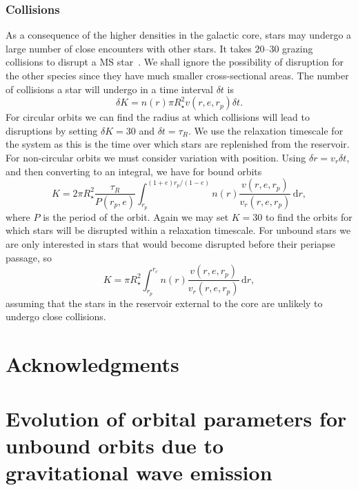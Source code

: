 \documentclass[useAMS,usedcolumn,usegraphicx,usenatbib]{mn2e}
\newcommand{\dd}{\ensuremath{\mathrm{d}}}
\newcommand{\intd}[4]{\ensuremath{\int_{#1}^{#2}{#3}\,\dd{#4}}}
\begin{document}
\subsubsection{Collisions}

As a consequence of the higher densities in the galactic core, stars may undergo a large number of close encounters with other stars. It takes $20$--$30$ grazing collisions to disrupt a MS star~\citep{Freitag2006}. We shall ignore the possibility of disruption for the other species since they have much smaller cross-sectional areas. The number of collisions a star will undergo in a time interval $\delta t$ is
\begin{equation}
\delta K = n(r) \pi R_\star^2 v(r,e,r_p)\delta t.
\end{equation}
For circular orbits we can find the radius at which collisions will lead to disruptions by setting $\delta K = 30$ and $\delta t = \tau_R$. We use the relaxation timescale for the system as this is the time over which stars are replenished from the reservoir. For non-circular orbits we must consider variation with position. Using $\delta r = v_r \delta t$, and then converting to an integral, we have for bound orbits
\begin{equation}
K = 2\pi R_\star^2 \frac{\tau_R}{P(r_p,e)}\intd{r_p}{(1+e)r_p/(1-e)}{n(r)\frac{v(r,e,r_p)}{v_r(r,e,r_p)}}{r},
\end{equation}
where $P$ is the period of the orbit. Again we may set $K = 30$ to find the orbits for which stars will be disrupted within a relaxation timescale. For unbound stars we are only interested in stars that would become disrupted before their periapse passage, so
\begin{equation}
K = \pi R_\star^2 \intd{r_p}{r_c}{n(r)\frac{v(r,e,r_p)}{v_r(r,e,r_p)}}{r},
\end{equation}
assuming that the stars in the reservoir external to the core are unlikely to undergo close collisions.


\section*{Acknowledgments}






\appendix

\section[]{Evolution of orbital parameters for unbound orbits due to gravitational wave emission}\label{sec:Unbound}
\end{document}
